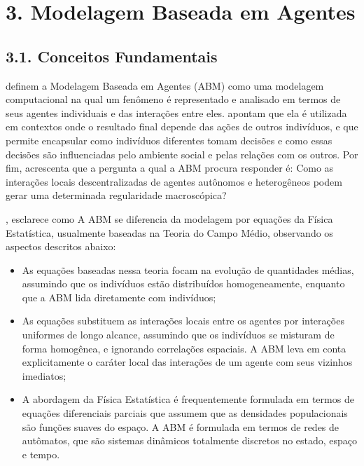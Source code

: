 \documentclass[12pt,oneside,a4paper,brazil,sumario=tradicional]{abntex2}
\begin{document}
\section*{3. Modelagem Baseada em Agentes}
\subsection*{3.1. Conceitos Fundamentais}
\textcite{wilensky2015} definem a Modelagem Baseada em Agentes (ABM) como uma modelagem computacional na qual um fenômeno é representado e analisado em termos de seus agentes individuais e das interações entre eles. \textcite{namatame2016} apontam que ela é utilizada em contextos onde o resultado final depende das ações de outros indivíduos, e que permite encapsular como indivíduos diferentes tomam decisões e como essas decisões são influenciadas pelo ambiente social e pelas relações com os outros. Por fim, \textcite{epstein1999} acrescenta que a pergunta a qual a ABM procura responder é: Como as interações locais descentralizadas de agentes autônomos e heterogêneos podem gerar uma determinada regularidade macroscópica?

\textcite{boccara2004}, esclarece como A ABM se diferencia da modelagem por equações da Física Estatística, usualmente baseadas na Teoria do Campo Médio, observando os aspectos descritos abaixo:

\begin{itemize}
  \item As equações baseadas nessa teoria focam na evolução de quantidades médias, assumindo que os indivíduos estão distribuídos homogeneamente, enquanto que a ABM lida diretamente com indivíduos;
  \item As equações substituem as interações locais entre os agentes por interações uniformes de longo alcance, assumindo que os indivíduos se misturam de forma homogênea, e ignorando correlações espaciais. A ABM leva em conta explicitamente o caráter local das interações de um agente com seus vizinhos imediatos;
  \item A abordagem da Física Estatística é frequentemente formulada em termos de equações diferenciais parciais que assumem que as densidades populacionais são funções suaves do espaço. A ABM é formulada em termos de redes de autômatos, que são sistemas dinâmicos totalmente discretos no estado, espaço e tempo.
\end{itemize}
\end{document}
